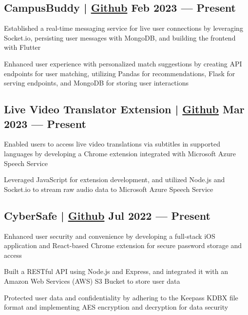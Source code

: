 \subsection{{CampusBuddy | \href{https://github.com/pegliang/CampusBuddy}{Github} \hfill Feb 2023 --- Present}}
\begin{zitemize}
\item Established a real-time messaging service for live user connections by leveraging Socket.io, persisting user messages with MongoDB, and building the frontend with Flutter
\item Enhanced user experience with personalized match suggestions by creating API endpoints for user matching, utilizing Pandas for recommendations, Flask for serving endpoints, and MongoDB for storing user interactions
\end{zitemize}

\subsection{{Live Video Translator Extension | \href{https://github.com/jerikjakobsen/Translator-Extension}{Github} \hfill Mar 2023 --- Present}}
\begin{zitemize}
\item Enabled users to access live video translations via subtitles in supported languages by developing a Chrome extension integrated with Microsoft Azure Speech Service
\item Leveraged JavaScript for extension development, and utilized Node.js and Socket.io to stream raw audio data to Microsoft Azure Speech Service
\end{zitemize}

\subsection{{CyberSafe | \href{https://github.com/jerikjakobsen/CyberSafe}{Github} \hfill Jul 2022 --- Present}}
\begin{zitemize}
\item Enhanced user security and convenience by developing a full-stack iOS application and React-based Chrome extension for secure password storage and access
\item Built a RESTful API using Node.js and Express, and integrated it with an Amazon Web Services (AWS) S3 Bucket to store user data
\item Protected user data and confidentiality by adhering to the Keepass KDBX file format and implementing AES encryption and decryption for data security
\end{zitemize}